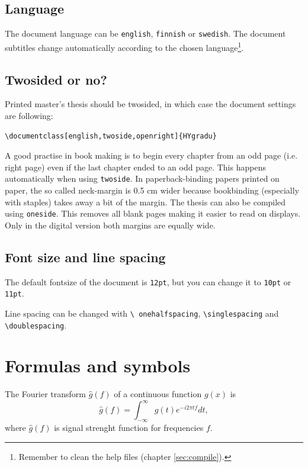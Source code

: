 \documentclass[english,twoside,openright]{HYgradu}
\begin{document}
\section{Language}

The document language can be \texttt{english}, \texttt{finnish} or
\texttt{swedish}. The document subtitles change automatically
according to the chosen language\footnote{Remember to clean the help
  files (chapter \ref{sec:compile}).}.
 
\section{Twosided or no?}
 
Printed master's thesis should be twosided, in which case the document
settings are following:
\begin{verbatim}
\documentclass[english,twoside,openright]{HYgradu}
\end{verbatim}
A good practise in book making is to begin every chapter from an odd
page (i.e. right page) even if the last chapter ended to an odd
page. This happens automatically when using \texttt{twoside}. In
paperback-binding papers printed on paper, the so called neck-margin
is 0.5 cm wider because bookbinding (especially with staples) takes
away a bit of the margin.  The thesis can also be compiled using
\texttt{oneside}. This removes all blank pages making it easier to
read on displays. Only in the digital version both margins are equally
wide.

\section{Font size and line spacing}

The default fontsize of the document is \texttt{12pt}, but you can
change it to \texttt{10pt} or \texttt{11pt}.

Line spacing can be changed with \texttt{\textbackslash
  onehalfspacing}, \texttt{\textbackslash singlespacing} and
\texttt{\textbackslash doublespacing}.


\chapter{Formulas and symbols}

The Fourier transform $\hat{g} (f)$ of a continuous function $g(x)$ is
\begin{equation}
\label{eq: Fourier}
\hat{g}(f) = \int_{-\infty}^{\infty}g(t)e^{-i 2 \pi t f} dt,
\end{equation}
where $\hat{g}(f)$ is signal strenght function for frequencies $f$.
\end{document}
